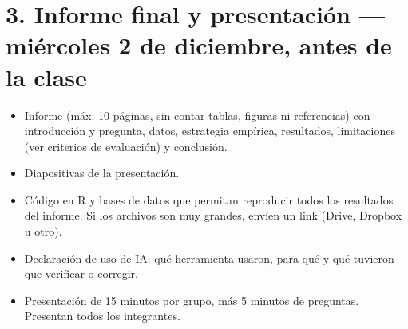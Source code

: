 \documentclass[letterpaper,11pt]{article}
\begin{document}
\section*{3. Informe final y presentación --- miércoles 2 de diciembre, antes de la clase}
\begin{itemize}
  \item Informe (máx. 10 páginas, sin contar tablas, figuras ni referencias) con introducción y pregunta, datos, estrategia empírica, resultados, limitaciones (ver criterios de evaluación) y conclusión.
  \item Diapositivas de la presentación.
  \item Código en R y bases de datos que permitan reproducir todos los resultados del informe. Si los archivos son muy grandes, envíen un link (Drive, Dropbox u otro).
  \item Declaración de uso de IA: qué herramienta usaron, para qué y qué tuvieron que verificar o corregir.
  \item Presentación de 15 minutos por grupo, más 5 minutos de preguntas. Presentan todos los integrantes.
\end{itemize}

\newpage
\end{document}
